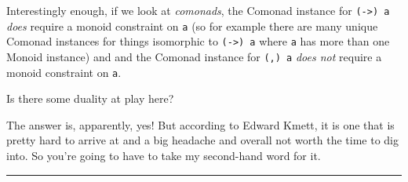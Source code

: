\documentclass[]{article}
\begin{document}
Interestingly enough, if we look at \emph{comonads}, the Comonad
instance for \texttt{(-\textgreater{})\ a} \emph{does} require a monoid
constraint on \texttt{a} (so for example there are many unique Comonad
instances for things isomorphic to \texttt{(-\textgreater{})\ a} where
\texttt{a} has more than one Monoid instance) and and the Comonad
instance for \texttt{(,)\ a} \emph{does not} require a monoid constraint
on \texttt{a}.

Is there some duality at play here?

The answer is, apparently, yes! But according to Edward Kmett, it is one
that is pretty hard to arrive at and a big headache and overall not
worth the time to dig into. So you're going to have to take my
second-hand word for it.

\begin{center}\rule{0.5\linewidth}{\linethickness}\end{center}
\end{document}
